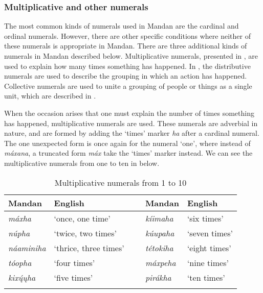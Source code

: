 \subsubsection{Multiplicative and other numerals}\label{SubSubSecOtherNums}

The most common kinds of numerals used in Mandan are the cardinal and ordinal numerals. However, there are other specific conditions where neither of these numerals is appropriate in Mandan. There are three additional kinds of numerals in Mandan described below. Multiplicative numerals, presented in , are used to explain how many times something has happened. In , the distributive numerals are used to describe the grouping in which an action has happened. Collective numerals are used to unite a grouping of people or things as a single unit, which are described in .

\label{SubSubSubMultiplicative}

When the occasion arises that one must explain the number of times something has happened, multiplicative numerals are used. These numerals are adverbial in nature, and are formed by adding the `times' marker \textit{ha} after a cardinal numeral. The one unexpected form is once again for the numeral `one', where instead of \textit{máxana}, a truncated form \textit{máx} take the `times' marker instead. We can see the multiplicative numerals from one to ten in  below.

\begin{table}
        \caption{Multiplicative numerals from 1 to 10}\label{Tab1to10multiplicative}
    \begin{tabular}{lllll}
\lsptoprule
    \textbf{Mandan}&\textbf{English}& ~&  \textbf{Mandan}&\textbf{English}\\
\midrule
    \textit{máxha}&`once, one time'&~&  \textit{kíimaha}&`six times'\\
    \textit{núpha}&`twice, two times'&~&     \textit{kúupaha}&`seven times'\\
    \textit{náaminiha}&`thrice, three times'&~&   \textit{tétokiha}&`eight times'\\
    \textit{tóopha}&`four times'&~&   \textit{máxpeha}&`nine times'\\
    \textit{kixų́ųha}&`five times'&~&\textit{pirákha}&`ten times'\\\lspbottomrule
    \end{tabular}

\end{table}

